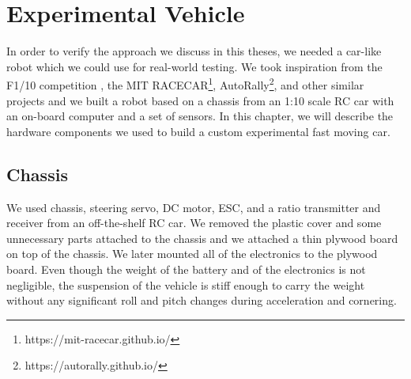 \chapter{Experimental Vehicle}

\label{chapter:hardware}

In order to verify the approach we discuss in this theses, we needed a car-like robot which we could use for real-world testing. We took inspiration from the F1/10 competition \cite{F1/10}, the MIT RACECAR\footnote{https://mit-racecar.github.io/}, AutoRally\footnote{https://autorally.github.io/}, and other similar projects and we built a robot based on a chassis from an 1:10 scale \gls{RC} car with an on-board computer and a set of sensors. In this chapter, we will describe the hardware components we used to build a custom experimental fast moving car.

\section{Chassis}

We used chassis, steering servo, \gls{DC} motor, \gls{ESC}, and a ratio transmitter and receiver from an off-the-shelf \gls*{RC} car. We removed the plastic cover and some unnecessary parts attached to the chassis and we attached a thin plywood board on top of the chassis. We later mounted all of the electronics to the plywood board. Even though the weight of the battery and of the electronics is not negligible, the suspension of the vehicle is stiff enough to carry the weight without any significant roll and pitch changes during acceleration and cornering.

